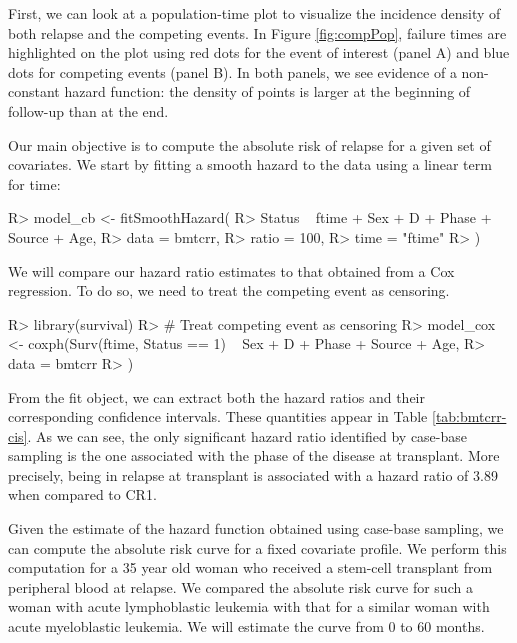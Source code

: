 \documentclass[
]{jss}
\begin{document}
First, we can look at a population-time plot to visualize the incidence
density of both relapse and the competing events. In Figure
\ref{fig:compPop}, failure times are highlighted on the plot using red
dots for the event of interest (panel A) and blue dots for competing
events (panel B). In both panels, we see evidence of a non-constant
hazard function: the density of points is larger at the beginning of
follow-up than at the end.

Our main objective is to compute the absolute risk of relapse for a
given set of covariates. We start by fitting a smooth hazard to the data
using a linear term for time:

\begin{CodeChunk}

\begin{CodeInput}
R> model_cb <- fitSmoothHazard(
R>   Status ~ ftime + Sex + D + Phase + Source + Age,
R>   data = bmtcrr,
R>   ratio = 100,
R>   time = "ftime"
R> )
\end{CodeInput}
\end{CodeChunk}

We will compare our hazard ratio estimates to that obtained from a Cox
regression. To do so, we need to treat the competing event as censoring.

\begin{CodeChunk}

\begin{CodeInput}
R> library(survival)
R> # Treat competing event as censoring
R> model_cox <- coxph(Surv(ftime, Status == 1) ~ Sex + D + Phase + Source + Age,
R>   data = bmtcrr
R> )
\end{CodeInput}
\end{CodeChunk}

From the fit object, we can extract both the hazard ratios and their
corresponding confidence intervals. These quantities appear in Table
\ref{tab:bmtcrr-cis}. As we can see, the only significant hazard ratio
identified by case-base sampling is the one associated with the phase of
the disease at transplant. More precisely, being in relapse at
transplant is associated with a hazard ratio of 3.89 when compared to
CR1.

Given the estimate of the hazard function obtained using case-base
sampling, we can compute the absolute risk curve for a fixed covariate
profile. We perform this computation for a 35 year old woman who
received a stem-cell transplant from peripheral blood at relapse. We
compared the absolute risk curve for such a woman with acute
lymphoblastic leukemia with that for a similar woman with acute
myeloblastic leukemia. We will estimate the curve from 0 to 60 months.
\end{document}
